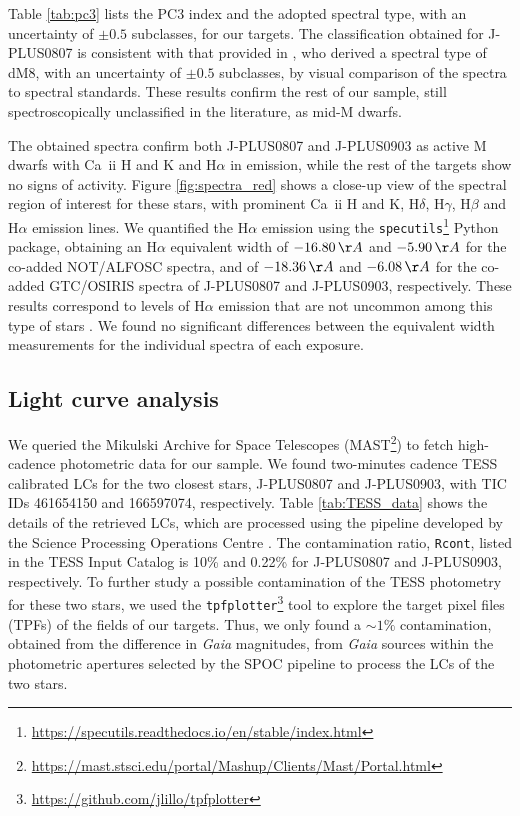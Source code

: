 Table \ref{tab:pc3} lists the PC3 index and the adopted spectral type, with an uncertainty of $\pm0.5$ subclasses, for our targets. The classification obtained for J-PLUS0807 is consistent with that provided in \citet{Schmidt2007}, who derived a spectral type of dM8, with an uncertainty of $\pm0.5$ subclasses, by visual comparison of the spectra to spectral standards. These results confirm the rest of our sample, still spectroscopically unclassified in the literature, as mid-M dwarfs.


The obtained spectra confirm both J-PLUS0807 and J-PLUS0903 as active M dwarfs with Ca~{\sc ii} H and K and H$\alpha$ in emission, while the rest of the targets show no signs of activity. Figure \ref{fig:spectra_red} shows a close-up view of the spectral region of interest for these stars, with prominent Ca~{\sc ii} H and K, H$\delta$, H$\gamma$, H$\beta$ and H$\alpha$ emission lines. We quantified the H$\alpha$ emission using the \texttt{specutils}\footnote{\url{https://specutils.readthedocs.io/en/stable/index.html}} \citep{specutils} Python package, obtaining an H$\alpha$ equivalent width of $-16.80\,\AA$ and $-5.90\,\AA$ for the co-added NOT/ALFOSC spectra, and of $-18.36\,\AA$ and $-6.08\,\AA$ for the co-added GTC/OSIRIS spectra of J-PLUS0807 and J-PLUS0903, respectively. These results correspond to levels of H$\alpha$ emission that are not uncommon among this type of stars \citep{Schmidt2007,Martin2010}. We found no significant differences between the equivalent width measurements for the individual spectra of each exposure.





\subsection{Light curve analysis}
\label{sec:tess}

We queried the Mikulski Archive for Space Telescopes (MAST\footnote{\url{https://mast.stsci.edu/portal/Mashup/Clients/Mast/Portal.html}}) to fetch high-cadence photometric data for our sample. We found two-minutes cadence TESS calibrated LCs for the two closest stars, J-PLUS0807 and J-PLUS0903, with TIC IDs 461654150 and 166597074, respectively. Table \ref{tab:TESS_data} shows the details of the retrieved LCs, which are processed using the pipeline developed by the Science Processing Operations Centre \cite[SPOC;][]{spoc}. The contamination ratio, \texttt{Rcont}, listed in the TESS Input Catalog \citep{tic8_2} is 10\% and 0.22\% for J-PLUS0807 and J-PLUS0903, respectively. To further study a possible contamination of the TESS photometry for these two stars, we used the \texttt{tpfplotter}\footnote{\url{https://github.com/jlillo/tpfplotter}} \citep{tpfplotter} tool to explore the target pixel files (TPFs) of the fields of our targets. Thus, we only found a $\sim1\%$ contamination, obtained from the difference in \textit{Gaia} magnitudes, from \textit{Gaia} sources within the photometric apertures selected by the SPOC pipeline to process the LCs of the two stars.


